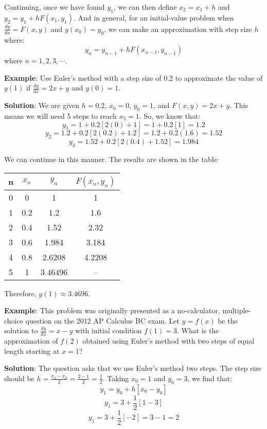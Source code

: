 Continuing, once we have found $y_1$, we can then define $x_2 = x_1 + h$ and 
$y_2 = y_1 + hF(x_1, y_1)$. And in general, for an initial-value problem when 
$\frac{dy}{dx} = F(x, y)$ and $y(x_0) = y_0$, we can make an approximation 
with step size $h$ where:
$$y_n = y_{n-1} + hF(x_{n-1},y_{n-1})$$
where $n = 1, 2, 3, \cdots$. 

\textbf{Example}: Use Euler's method with a step size of 0.2 to approximate 
the value of $y(1)$ if $\frac{dy}{dx} = 2x + y$ and $y(0) = 1$. 

\textbf{Solution}: We are given $h = 0.2$, $x_0 = 0$, $y_0 = 1$, and $F(x, y) 
= 2x + y$. This means we will need 5 steps to reach $x_{5} = 1$. So, we know 
that:
$$y_1 = 1 + 0.2[2(0) + 1] = 1 + 0.2[1] = 1.2$$
$$y_2 = 1.2 + 0.2[2(0.2) + 1.2] = 1.2 + 0.2(1.6) = 1.52$$
$$y_3 = 1.52 + 0.2[2(0.4) + 1.52] = 1.984$$

We can continue in this manner. The results are shown in the table:
\begin{center}
\begin{tabular}{|c|c|c|c|}\hline
n & $x_n$ & $y_n$ & $F(x_n, y_n)$ \\\hline
0 & 0 & 1 & 1\\\hline
1 & 0.2 & 1.2 & 1.6\\\hline
2 & 0.4 & 1.52 & 2.32\\\hline
3 & 0.6 & 1.984 & 3.184\\\hline
4 & 0.8 & 2.6208 & 4.2208\\\hline
5 & 1 & 3.46496 & --\\\hline
\end{tabular}
\end{center}

Therefore, $y(1) \approx 3.4696$.

\textbf{Example}: This problem was originally presented as a no-calculator, 
multiple-choice question on the 2012 AP Calculus BC exam. Let $y = f(x)$ be 
the solution to $\frac{dy}{dx} = x - y$ with initial condition $f(1) = 3$. 
What is the approximation of $f(2)$ obtained using Euler's method with two 
steps of equal length starting at $x = 1$?

\textbf{Solution}: The question asks that we use Euler's method two steps. The 
step size should be $h = \frac{x_2 - x_0}{2} = \frac{2 - 1}{2} = \frac{1}{2}$. 
Taking $x_0 = 1$ and $y_0 = 3$, we find that:
$$y_1 = y_0 + h \left[x_0 - y_0 \right]$$
$$y_1 = 3 + \frac{1}{2} \left[1 - 3 \right]$$
$$y_1 = 3 + \frac{1}{2} \left[ -2 \right] = 3 - 1 = 2$$

